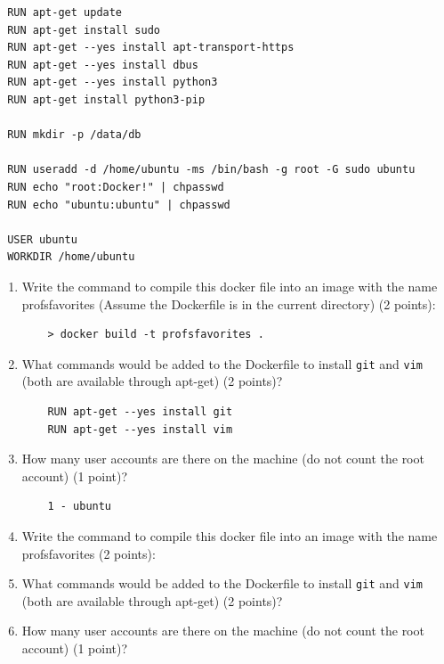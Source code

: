 \documentclass[10pt]{article}
\begin{document}
\begin{enumerate}
\begin{enumerate}
\begin{verbatim}
 RUN apt-get update
 RUN apt-get install sudo
 RUN apt-get --yes install apt-transport-https
 RUN apt-get --yes install dbus
 RUN apt-get --yes install python3
 RUN apt-get install python3-pip
 
 RUN mkdir -p /data/db
 
 RUN useradd -d /home/ubuntu -ms /bin/bash -g root -G sudo ubuntu
 RUN echo "root:Docker!" | chpasswd
 RUN echo "ubuntu:ubuntu" | chpasswd
 
 USER ubuntu
 WORKDIR /home/ubuntu
\end{verbatim}
\begin{enumerate}
	\beginanswers
	\item Write the command to compile this docker file into an image with the name profsfavorites (Assume the Dockerfile is in the current directory) (2 points):
	\begin{verbatim}
	> docker build -t profsfavorites . 
	\end{verbatim}
	\bigskip
	\item What commands would be added to the Dockerfile to install \verb|git| and \verb|vim| (both are available through apt-get) (2 points)?
	\begin{verbatim}
	RUN apt-get --yes install git
	RUN apt-get --yes install vim
	\end{verbatim}
	\bigskip
	\item How many user accounts are there on the machine (do not count the root account) (1 point)?
	\begin{verbatim}
	1 - ubuntu
		\end{verbatim}
\bigskip
\else
	\item Write the command to compile this docker file into an image with the name profsfavorites (2 points):
	\bigskip
	\bigskip
	\item What commands would be added to the Dockerfile to install \verb|git| and \verb|vim| (both are available through apt-get) (2 points)?
	\bigskip
	\bigskip
	\item How many user accounts are there on the machine (do not count the root account) (1 point)?
	\bigskip
	\bigskip
	\fi
\end{enumerate}
\end{enumerate}


\end{enumerate}
\end{document}
